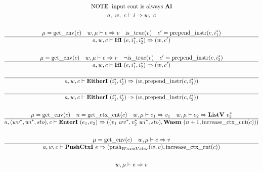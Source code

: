 




\newpage

\begin{gather*}
  \text{NOTE: input cont is always \al} \\
  a, ~ w, ~ c \vdash i \Rightarrow w, ~ c \\
%
\newline \\
  \mu = \getenv(c) \quad w, \mu \vdash e \Rightarrow v \quad
  \istrue(v) \quad c' = \prependinstr(c, \seq{i_1}) \\
  \hline
  a, w, c \vdash \ifi ~ (e, \seq{i_1}, \seq{i_2}) \Rightarrow (w, c') \\
%
\newline \\
  \mu = \getenv(c) \quad w, \mu \vdash e \Rightarrow v \quad
  \neg \istrue(v) \quad c' = \prependinstr(c, \seq{i_2}) \\
  \hline
  a, w, c \vdash \ifi ~ (e, \seq{i_1}, \seq{i_2}) \Rightarrow (w, c') \\
%
\newline \\
  \hline
  a, w, c \vdash \eitheri ~ (\seq{i_1}, \seq{i_2}) \Rightarrow (w, \prependinstr(c, \seq{i_1})) \\
%
\newline \\
  \hline
  a, w, c \vdash \eitheri ~ (\seq{i_1}, \seq{i_2}) \Rightarrow (w, \prependinstr(c, \seq{i_2})) \\
%
\newline \\
  \mu = \getenv(c) \quad
  n = \getctxcnt(c) \quad
  w, \mu \vdash e_1 \Rightarrow v_1 \quad
  w, \mu \vdash e_2 \Rightarrow \listv ~ \seq{v_2} \\
  \hline
  a, (\seq{wv}, \seq{wi}, sto), c \vdash \enteri ~ (e_1, e_2)
  \Rightarrow
  ((v_1 ~ \seq{wv}, \seq{v_2} ~ \seq{wi}, sto), \wasm ~ (n+1, \increasectxcnt(c))) \\
%
\newline \\
  \mu = \getenv(c) \quad w, \mu \vdash e \Rightarrow v \\
  \hline
  a, w, c \vdash \pushctxi ~ e
  \Rightarrow
  (\push_{WasmValue}(w, v), \increasectxcnt(c)) \\
%
\newline \\
  w, \mu \vdash e \Rightarrow v \\

\end{gather*}
